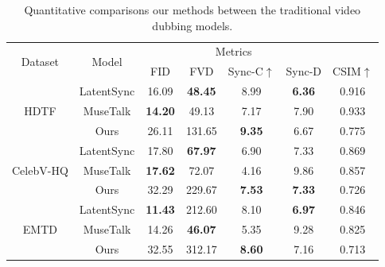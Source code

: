 \begin{table}[t]
        \centering
        \begin{tabular}{c|c|ccccc}
        \toprule
            \multirow{2}{*}{Dataset} & \multirow{2}{*}{Model} & \multicolumn{4}{c}{Metrics} \\
            & & FID & FVD  & Sync-C$\uparrow$ & Sync-D & CSIM$\uparrow$
            \\
            \midrule
            \multirow{3}{*}{HDTF} 
            & LatentSync        & 16.09 & \textbf{48.45}  & 8.99 & \textbf{6.36} & 0.916 \\
            & MuseTalk          & \textbf{14.20} & 49.13  & 7.17 & 7.90 & 0.933 \\
            & Ours              & 26.11 & 131.65 & \textbf{9.35} & 6.67 & 0.775 \\
            \midrule
            \multirow{3}{*}{CelebV-HQ} 
            & LatentSync        & 17.80 & \textbf{67.97}  & 6.90 & 7.33 & 0.869 \\
            & MuseTalk          & \textbf{17.62} & 72.07  & 4.16 & 9.86 & 0.857 \\
            & Ours              & 32.29 & 229.67 & \textbf{7.53} & \textbf{7.33} & 0.726 \\
            \midrule
            \multirow{3}{*}{EMTD} 
            & LatentSync        & \textbf{11.43} & 212.60 & 8.10 & \textbf{6.97} & 0.846 \\
            & MuseTalk          & 14.26 & \textbf{46.07}  & 5.35 & 9.28 & 0.825 \\
            & Ours              & 32.55 & 312.17 & \textbf{8.60} & 7.16 & 0.713\\
            \bottomrule
        \end{tabular}
        \caption{
        Quantitative comparisons our methods between the traditional video dubbing models.
        }
        \label{tab:quantitative-dub}
\end{table}

